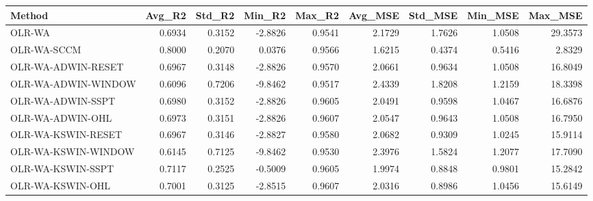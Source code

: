\begin{tabular}{lrrrrrrrr}
\toprule
Method & Avg_R2 & Std_R2 & Min_R2 & Max_R2 & Avg_MSE & Std_MSE & Min_MSE & Max_MSE \\
\midrule
OLR-WA & 0.6934 & 0.3152 & -2.8826 & 0.9541 & 2.1729 & 1.7626 & 1.0508 & 29.3573 \\
OLR-WA-SCCM & 0.8000 & 0.2070 & 0.0376 & 0.9566 & 1.6215 & 0.4374 & 0.5416 & 2.8329 \\
OLR-WA-ADWIN-RESET & 0.6967 & 0.3148 & -2.8826 & 0.9570 & 2.0661 & 0.9634 & 1.0508 & 16.8049 \\
OLR-WA-ADWIN-WINDOW & 0.6096 & 0.7206 & -9.8462 & 0.9517 & 2.4339 & 1.8208 & 1.2159 & 18.3398 \\
OLR-WA-ADWIN-SSPT & 0.6980 & 0.3152 & -2.8826 & 0.9605 & 2.0491 & 0.9598 & 1.0467 & 16.6876 \\
OLR-WA-ADWIN-OHL & 0.6973 & 0.3151 & -2.8826 & 0.9607 & 2.0547 & 0.9643 & 1.0508 & 16.7950 \\
OLR-WA-KSWIN-RESET & 0.6967 & 0.3146 & -2.8827 & 0.9580 & 2.0682 & 0.9309 & 1.0245 & 15.9114 \\
OLR-WA-KSWIN-WINDOW & 0.6145 & 0.7125 & -9.8462 & 0.9530 & 2.3976 & 1.5824 & 1.2077 & 17.7090 \\
OLR-WA-KSWIN-SSPT & 0.7117 & 0.2525 & -0.5009 & 0.9605 & 1.9974 & 0.8848 & 0.9801 & 15.2842 \\
OLR-WA-KSWIN-OHL & 0.7001 & 0.3125 & -2.8515 & 0.9607 & 2.0316 & 0.8986 & 1.0456 & 15.6149 \\
\bottomrule
\end{tabular}
